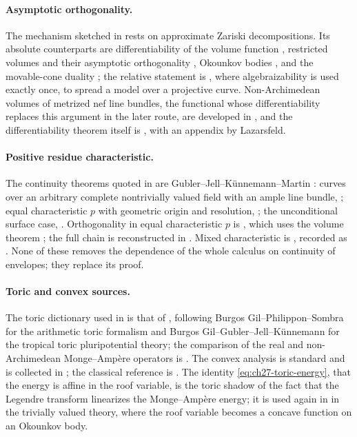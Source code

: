 \paragraph{Asymptotic orthogonality.}
The mechanism sketched in  rests on
approximate Zariski decompositions.  Its absolute counterparts are
differentiability of the volume function \cite{BFJ09}, restricted volumes
and their asymptotic orthogonality \cite{ELMNP09}, Okounkov bodies
\cite{LM09}, and the movable-cone duality \cite{BDPP13}; the relative
statement is \cite[Appendix~A]{BFJ15}, where algebraizability is used
exactly once, to spread a model over a projective curve.  Non-Archimedean
volumes of metrized nef line bundles, the functional whose
differentiability replaces this argument in the later route, are developed
in \cite{BGM21}, and the differentiability theorem itself is
\cite[Theorem~6.3.2 and Theorem~6.3.3]{BGGJKM20}, with an appendix by
Lazarsfeld.

\paragraph{Positive residue characteristic.}
The continuity theorems quoted in 
are Gubler--Jell--K\"unnemann--Martin \cite{GJKM19}: curves over an
arbitrary complete nontrivially valued field with an ample line bundle,
\cite[Theorem~1.1]{GJKM19}; equal characteristic \(p\) with geometric origin and
resolution, \cite[Theorem~8.2]{GJKM19}; the unconditional surface case,
\cite[Corollary~8.3]{GJKM19}.  Orthogonality in equal characteristic \(p\)
is \cite[Theorem~9.2]{GJKM19}, which uses the volume theorem
\cite[Theorem~6.3.2]{BGGJKM20}; the full chain is reconstructed in
.  Mixed characteristic is
\cite{FGK25}, recorded as
.  None of these removes the
dependence of the whole calculus on continuity of envelopes; they replace
its proof.

\paragraph{Toric and convex sources.}
The toric dictionary used in  is that of
, following Burgos Gil--Philippon--Sombra
\cite{BGPS14} for the arithmetic toric formalism and Burgos
Gil--Gubler--Jell--K\"unnemann \cite{BGJKK25} for the tropical toric
pluripotential theory; the comparison of the real and non-Archimedean
Monge--Amp\`ere operators is \cite{Vil20}.  The convex analysis is standard
and is collected in ; the classical reference is
\cite{Roc70}.  The identity \eqref{eq:ch27-toric-energy}, that the energy is
affine in the roof variable, is the toric shadow of the fact that the
Legendre transform linearizes the Monge--Amp\`ere energy; it is used again
in  in the trivially valued theory, where the roof
variable becomes a concave function on an Okounkov body.

